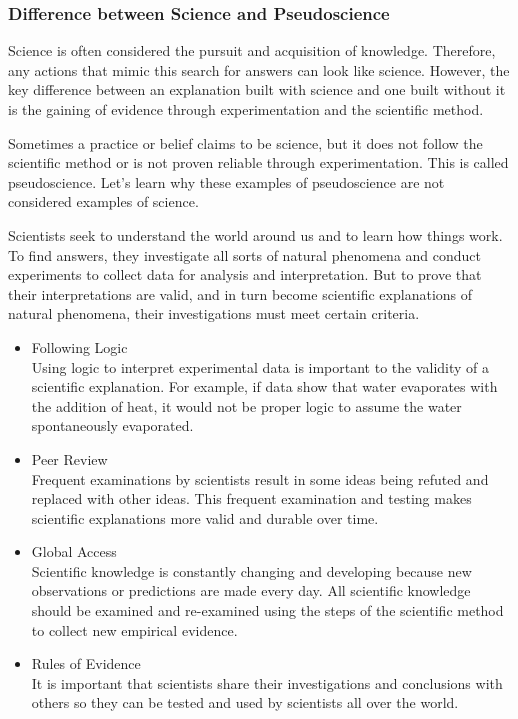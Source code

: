 
\subsubsection*{Difference between Science and Pseudoscience}

Science is often considered the pursuit and acquisition of knowledge.
Therefore, any actions that mimic this search for answers can look like
science. However, the key difference between an explanation built with science
and one built without it is the gaining of evidence through experimentation and
the scientific method.

Sometimes a practice or belief claims to be science, but it does not follow the
scientific method or is not proven reliable through experimentation. This is
called pseudoscience. Let's learn why these examples of pseudoscience are not
considered examples of science.

Scientists seek to understand the world around us and to learn how things work.
To find answers, they investigate all sorts of natural phenomena and conduct
experiments to collect data for analysis and interpretation. But to prove that
their interpretations are valid, and in turn become scientific explanations of
natural phenomena, their investigations must meet certain criteria.

\begin{itemize}
    \item Following Logic \\ Using logic to interpret experimental data is
        important to the validity of a scientific explanation. For example, if
        data show that water evaporates with the addition of heat, it would not
        be proper logic to assume the water spontaneously evaporated.
    \item Peer Review \\ Frequent examinations by scientists result in some
        ideas being refuted and replaced with other ideas. This frequent
        examination and testing makes scientific explanations more valid and
        durable over time.
    \item Global Access \\ Scientific knowledge is constantly changing and
        developing because new observations or predictions are made every day.
        All scientific knowledge should be examined and re-examined using the
        steps of the scientific method to collect new empirical evidence.
    \item Rules of Evidence \\ It is important that scientists share their
        investigations and conclusions with others so they can be tested and
        used by scientists all over the world.
\end{itemize}

